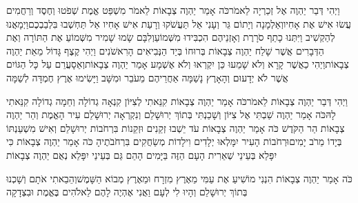 \documentclass[../main/main.tex]{subfiles}
\begin{document}
\begin{multicols*}{\ncols}
וַיְהִי דְּבַר יַהְוֶה אֶל זְכַרְיָה לֵאמֹר\PreVerseSpace{}כֹּה אָמַר יַהְוֶה צְבָאוֹת לֵאמֹר מִשְׁפַּט אֱמֶת שְׁפֹטוּ וְחֶסֶד וְרַחֲמִים עֲשׂוּ אִישׁ אֶת אָחִיו\PreVerseSpace{}וְאַלְמָנָה וְיָתוֹם גֵּר וְעָנִי אַל תַּעֲשֹׁקוּ וְרָעַת אִישׁ אָחִיו אַל תַּחְשְׁבוּ בִּלְבַבְכֶם\PreVerseSpace{}וַיְמָאֲנוּ לְהַקְשִׁיב וַיִּתְּנוּ כָתֵף סֹרָרֶת וְאָזְנֵיהֶם הִכְבִּידוּ מִשְּׁמוֹעַ\PreVerseSpace{}וְלִבָּם שָׂמוּ שָׁמִיר מִשְּׁמוֹעַ אֶת הַתּוֹרָה וְאֶת הַדְּבָרִים אֲשֶׁר שָׁלַח יַהְוֶה צְבָאוֹת בְּרוּחוֹ בְּיַד הַנְּבִיאִים הָרִאשֹׁנִים וַיְהִי קֶצֶף גָּדוֹל מֵאֵת יַהְוֶה צְבָאוֹת\PreVerseSpace{}וַיְהִי כַאֲשֶׁר קָרָא וְלֹא שָׁמֵעוּ כֵּן יִקְרְאוּ וְלֹא אֶשְׁמָע אָמַר יַהְוֶה צְבָאוֹת\PreVerseSpace{}וְאֵסָעֲרֵם עַל כָּל הַגּוֹיִם אֲשֶׁר לֹא יְדָעוּם וְהָאָרֶץ נָשַׁמָּה אַחֲרֵיהֶם מֵעֹבֵר וּמִשָּׁב וַיָּשִׂימוּ אֶרֶץ חֶמְדָּה לְשַׁמָּה\OpenSection{}\par
{}וַיְהִי דְּבַר יַהְוֶה צְבָאוֹת לֵאמֹר\PreVerseSpace{}כֹּה אָמַר יַהְוֶה צְבָאוֹת קִנֵּאתִי לְצִיּוֹן קִנְאָה גְדוֹלָה וְחֵמָה גְדוֹלָה קִנֵּאתִי לָהּ\PreVerseSpace{}כֹּה אָמַר יַהְוֶה שַׁבְתִּי אֶל צִיּוֹן וְשָׁכַנְתִּי בְּתוֹךְ יְרוּשָׁלֵם וְנִקְרְאָה יְרוּשָׁלֵם עִיר הָאֱמֶת וְהַר יַהְוֶה צְבָאוֹת הַר הַקֹּדֶשׁ \ClosedSection{}כֹּה אָמַר יַהְוֶה צְבָאוֹת עֹד יֵשְׁבוּ זְקֵנִים וּזְקֵנוֹת בִּרְחֹבוֹת יְרוּשָׁלֵם וְאִישׁ מִשְׁעַנְתּוֹ בְּיָדוֹ מֵרֹב יָמִים\PreVerseSpace{}וּרְחֹבוֹת הָעִיר יִמָּלְאוּ יְלָדִים וִילָדוֹת מְשַׂחֲקִים בִּרְחֹבֹתֶיהָ \ClosedSection{}כֹּה אָמַר יַהְוֶה צְבָאוֹת כִּי יִפָּלֵא בְּעֵינֵי שְׁאֵרִית הָעָם הַזֶּה בַּיָּמִים הָהֵם גַּם בְּעֵינַי יִפָּלֵא נְאֻם יַהְוֶה צְבָאוֹת\OpenSection{}\par
{}כֹּה אָמַר יַהְוֶה צְבָאוֹת הִנְנִי מוֹשִׁיעַ אֶת עַמִּי מֵאֶרֶץ מִזְרָח וּמֵאֶרֶץ מְבוֹא הַשָּׁמֶשׁ\PreVerseSpace{}וְהֵבֵאתִי אֹתָם וְשָׁכְנוּ בְּתוֹךְ יְרוּשָׁלֵם וְהָיוּ לִי לְעָם וַאֲנִי אֶהְיֶה לָהֶם לֵאלֹהִים בֶּאֱמֶת וּבִצְדָקָה\OpenSection{}\par

\end{multicols*}
\end{document}
